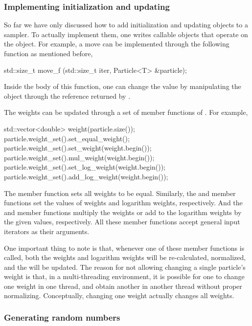 \subsubsection{Implementing initialization and updating}
\label{ssub:Implementing initialization and updating}

So far we have only discussed how to add initialization and updating objects
to a sampler. To actually implement them, one writes callable objects that
operate on the  object. For example, a move can be
implemented through the following function as mentioned before,
\begin{cppcode}
std::size_t move_f (std::size_t iter, Particle<T> &particle);
\end{cppcode}
Inside the body of this function, one can change the value by manipulating the
object through the reference returned by .

The weights can be updated through a set of member functions of
. For example,
\begin{cppcode}
std::vector<double> weight(particle.size());
particle.weight_set().set_equal_weight();
particle.weight_set().set_weight(weight.begin());
particle.weight_set().mul_weight(weight.begin());
particle.weight_set().set_log_weight(weight.begin());
particle.weight_set().add_log_weight(weight.begin());
\end{cppcode}
The  member function sets all weights to be equal.
Similarly, the  and  member
functions set the values of weights and logarithm weights, respectively. And
the  and  member functions
multiply the weights or add to the logarithm weights by the given values,
respectively. All these member functions accept general input iterators as
their arguments.

One important thing to note is that, whenever one of these member functions is
called, both the weights and logarithm weights will be re-calculated,
normalized, and the \ess will be updated. The reason for not allowing changing
a single particle's weight is that, in a multi-threading environment, it is
possible for one to change one weight in one thread, and obtain another in
another thread without proper normalizing. Conceptually, changing one weight
actually changes all weights.

\subsubsection{Generating random numbers}
\label{ssub:Generating random numbers}

